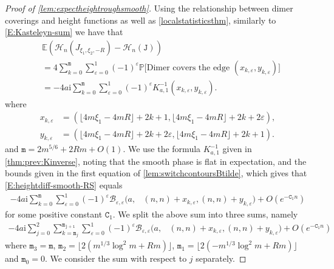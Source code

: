 \documentclass[11pt,twoside]{amsart}
\theoremstyle{plain}
\numberwithin{quest}{section}
\theoremstyle{remark}
\numberwithin{rem}{section}
\theoremstyle{definition}
\newcommand{\eps}{\varepsilon}
\begin{document}
\begin{proof}[Proof of \cref{lem:expectheightroughsmooth}]
		Using the relationship between dimer coverings and height functions as well as \cref{localstatisticsthm}, similarly to \eqref{E:Kasteleyn-sum} we have that
		\begin{equation} \label{E:heightdiff-smooth-RS}
			\begin{split}
				&\mathbb{E}(\mathcal{H}_n(J_{\xi_1,\xi_2,-R})-\mathcal{H}_n(\mathtt{J}))\\
                &=4 \sum_{k=0}^\mathtt{m} \sum_{\eps=0}^1 (-1)^{\eps}\mathbb{P}\big[\mbox{Dimer covers the edge } (x_{k, \eps}, y_{k, \eps}) 
            \big] \\ 
				&=-4a\mathrm{i} \sum_{k=0}^{\mathtt{m}} \sum_{\eps=0}^1 (-1)^{\eps}  K^{-1}_{a,1}(x_{k, \eps}, y_{k, \eps}).
			\end{split}
		\end{equation}
		where
        \begin{align*}
           x_{k, \eps} &=(\lfloor 4m \xi_1- 4mR \rfloor +2k+1, \lfloor 4m \xi_1- 4mR \rfloor +2k+2\eps), \\
		y_{k, \eps}&=(\lfloor 4m \xi_1- 4mR \rfloor +2k+2\eps, \lfloor 4m \xi_1- 4mR \rfloor +2k+1). 
        \end{align*}
		and $\mathtt{m} = 2 m^{5/6} + 2R m + O(1)$.
		We use the formula $K_{a,1}^{-1}$ given in \cref{thm:prev:Kinverse}, noting that the smooth phase is flat in expectation, and the bounds given in the first equation of \cref{lem:switchcontoursBtilde}, which gives that \eqref{E:heightdiff-smooth-RS} equals
		\begin{equation*}
			\begin{split}
            -4a\mathrm{i} \sum_{k=0}^{\mathtt{m}} \sum_{\eps=0}^1 (-1)^{\eps} \mathcal{B}_{\eps,\eps}\big(a,
				&(n,n)+x_{k, \eps},(n,n)+y_{k, \eps} \big) +O(e^{-\mathtt{C}_1n})
			\end{split}
		\end{equation*}
		for some positive constant $\mathtt{C}_1$.  
		We split the above sum into three sums, namely
		\begin{equation}
			\begin{split}\label{L:Proof:expectedheight-splitequation}
			-4a\mathrm{i} \sum_{j=0}^2\sum_{k=\mathtt{m}_{j}}^{\mathtt{m_{j+1}}} \sum_{\eps=0}^1 (-1)^{\eps} \mathcal{B}_{\eps,\eps}\big(a,
				&(n,n)+x_{k, \eps},(n,n)+y_{k, \eps} \big) +O(e^{-\mathtt{C}_1n})
			\end{split}
		\end{equation}
		where $\mathtt{m}_3=\mathtt{m}$, $\mathtt{m}_2=\lfloor2( m^{1/3}\log^2 m+Rm)\rfloor$, $\mathtt{m}_1=\lfloor2( -m^{1/3}\log^2 m+Rm)\rfloor$ and $\mathtt{m}_0=0$.  We consider the sum with respect to $j$ separately.  
		

\end{proof}
\end{document}
